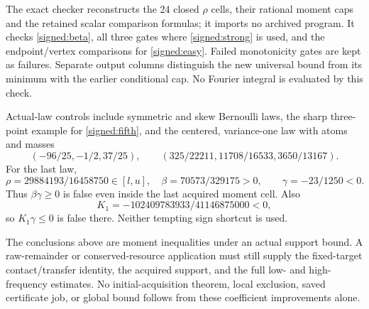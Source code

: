 The exact checker reconstructs the 24 closed $\rho$ cells, their rational
moment caps and the retained scalar comparison formulas; it imports no
archived program. It checks \eqref{signed:beta}, all three gates where
\eqref{signed:strong} is used, and the endpoint/vertex comparisons for
\eqref{signed:easy}. Failed monotonicity gates are kept as failures.
Separate output columns distinguish the new universal bound from its
minimum with the earlier conditional cap. No Fourier integral is
evaluated by this check.

Actual-law controls include symmetric and skew Bernoulli laws, the sharp
three-point example for \eqref{signed:fifth}, and the centered,
variance-one law with atoms and masses
\[
 (-96/25,-1/2,37/25),\qquad
 (325/22211,11708/16533,3650/13167).
\]
For the last law,
\[
 \rho=29884193/16458750\in[l,u],\quad
 \beta=70573/329175>0,\qquad\gamma=-23/1250<0.
\]
Thus $\beta\gamma\ge0$ is false even inside the last acquired moment
cell. Also
\[
 K_1=-102409783933/41146875000<0,
\]
so $K_1\gamma\le0$ is false there. Neither tempting sign shortcut is used.

The conclusions above are moment inequalities under an actual support
bound. A raw-remainder or conserved-resource application must still
supply the fixed-target contact/transfer identity, the acquired support,
and the full low- and high-frequency estimates. No initial-acquisition
theorem, local exclusion, saved certificate job, or global bound follows
from these coefficient improvements alone.
